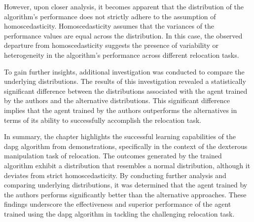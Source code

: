 However, upon closer analysis, it becomes apparent that the distribution of the algorithm's performance does not strictly adhere to the assumption of homoscedasticity. Homoscedasticity assumes that the variances of the performance values are equal across the distribution. In this case, the observed departure from homoscedasticity suggests the presence of variability or heterogeneity in the algorithm's performance across different relocation tasks. \medskip

To gain further insights, additional investigation was conducted to compare the underlying distributions. The results of this investigation revealed a statistically significant difference between the distributions associated with the agent trained by the authors and the alternative distributions. This significant difference implies that the agent trained by the authors outperforms the alternatives in terms of its ability to successfully accomplish the relocation task.\medskip

In summary, the chapter highlights the successful learning capabilities of the \gls{dapg} algorithm from demonstrations, specifically in the context of the dexterous manipulation task of relocation. The outcomes generated by the trained algorithm exhibit a distribution that resembles a normal distribution, although it deviates from strict homoscedasticity. By conducting further analysis and comparing underlying distributions, it was determined that the agent trained by the authors performs significantly better than the alternative approaches. These findings underscore the effectiveness and superior performance of the agent trained using the \gls{dapg} algorithm in tackling the challenging relocation task.